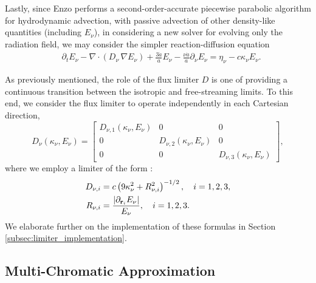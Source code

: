 \documentclass[10pt]{article}
\renewcommand{\(}{\left(}
\renewcommand{\)}{\right)}
\newcommand{\rvec}{{\bf r}}
\newcommand{\adot}{\dot{a}}
\newcommand{\Enu}{E_{\nu}}
\begin{document}
Lastly, since Enzo performs a second-order-accurate piecewise
parabolic algorithm for hydrodynamic advection, with passive advection
of other density-like quantities (including $\Enu$), in considering a
new solver for evolving only the radiation field, we may consider the
simpler reaction-diffusion equation
\begin{align}
  \label{eq:mgfld_simplified2}
  &\partial_{t} \Enu - \nabla\cdot(D_{\nu}\,\nabla\Enu) 
      + \frac{3 \adot}{a} \Enu - \frac{\nu \adot}{a}\partial_{\nu}\Enu
    = \eta_{\nu} - c \kappa_{\nu} \Enu.
\end{align}


As previously mentioned, the role of the flux limiter $D$ is one of
providing a continuous transition between the isotropic and
free-streaming limits.  To this end, we consider the flux limiter to
operate independently in each Cartesian direction,
\[
   D_{\nu}(\kappa_{\nu},\Enu) = \left[\begin{array}{ccc} 
       D_{\nu,1}(\kappa_{\nu},\Enu) & 0 & 0 \\
       0 & D_{\nu,2}(\kappa_{\nu},\Enu) & 0 \\
       0 & 0 & D_{\nu,3}(\kappa_{\nu},\Enu) 
     \end{array}\right],
\]
where we employ a limiter of the form  \cite{Morel2000}: 
\begin{align}
  \label{eq:Morel_limiterD}
  D_{\nu,i} &= c \left(9\kappa_{\nu}^2 + R_{\nu,i}^2\right)^{-1/2}, \quad i=1,2,3,\\
  \label{eq:Morel_limiterR}
  R_{\nu,i} &= \frac{|\partial_{\rvec_i}\Enu|}{\Enu}, \quad i=1,2,3.
\end{align}
We elaborate further on the implementation of these formulas in
Section \ref{subsec:limiter_implementation}.







\subsection{Multi-Chromatic Approximation}
\label{subsec:multi_chromatic}
\end{document}
